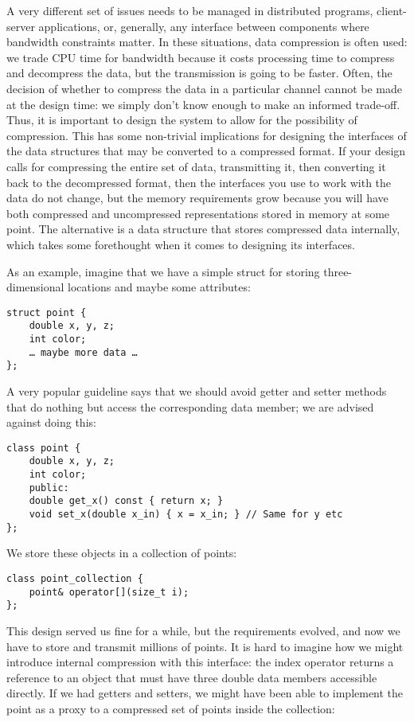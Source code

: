 A very different set of issues needs to be managed in distributed programs, client-server applications, or, generally, any interface between components where bandwidth constraints matter. In these situations, data compression is often used: we trade CPU time for bandwidth because it costs processing time to compress and decompress the data, but the transmission is going to be faster. Often, the decision of whether to compress the data in a particular channel cannot be made at the design time: we simply don't know enough to make an informed trade-off. Thus, it is important to design the system to allow for the possibility of compression. This has some non-trivial implications for designing the interfaces of the data structures that may be converted to a compressed format. If your design calls for compressing the entire set of data, transmitting it, then converting it back to the decompressed format, then the interfaces you use to work with the data do not change, but the memory requirements grow because you will have both compressed and uncompressed representations stored in memory at some point. The alternative is a data structure that stores compressed data internally, which takes some forethought when it comes to designing its interfaces. 

As an example, imagine that we have a simple struct for storing three-dimensional locations and maybe some attributes:

\begin{lstlisting}[style=styleCXX]
struct point {
	double x, y, z;
	int color;
	… maybe more data …
};
\end{lstlisting}

A very popular guideline says that we should avoid getter and setter methods that do nothing but access the corresponding data member; we are advised against doing this:

\begin{lstlisting}[style=styleCXX]
class point {
	double x, y, z;
	int color;
	public:
	double get_x() const { return x; }
	void set_x(double x_in) { x = x_in; } // Same for y etc
};
\end{lstlisting}

We store these objects in a collection of points:

\begin{lstlisting}[style=styleCXX]
class point_collection {
	point& operator[](size_t i);
};
\end{lstlisting}

This design served us fine for a while, but the requirements evolved, and now we have to store and transmit millions of points. It is hard to imagine how we might introduce internal compression with this interface: the index operator returns a reference to an object that must have three double data members accessible directly. If we had getters and setters, we might have been able to implement the point as a proxy to a compressed set of points inside the collection:

